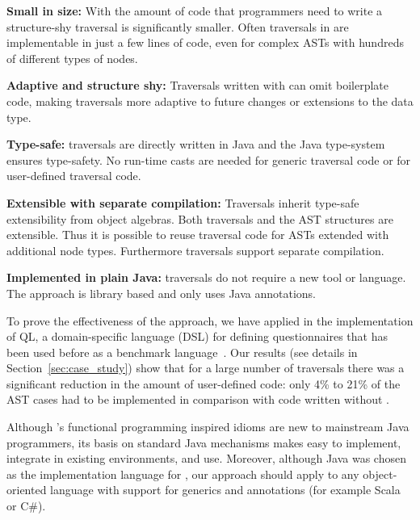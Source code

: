 \begin{itemize*}

\item {\bf Small in size:} With \name the amount of code that
  programmers need to write a structure-shy traversal is significantly smaller.
  Often traversals in \name are implementable in just a few lines
  of code, even for complex ASTs with hundreds of different types of
  nodes.

\item {\bf Adaptive and structure shy:}  Traversals written with \name can omit
  boilerplate code, making traversals more adaptive to
  future changes or extensions to the data type.

\item {\bf Type-safe:} \name traversals are directly written in Java
  and the Java type-system ensures type-safety. No run-time casts are
  needed for generic traversal code or for user-defined traversal
  code.

\item {\bf Extensible with separate compilation:} Traversals inherit type-safe
  extensibility from object algebras. Both traversals and the AST structures
  are extensible. Thus it is possible to
  reuse traversal code for ASTs extended with additional
  node types. Furthermore \name traversals support separate compilation.

\item {\bf Implemented in plain Java:} \name traversals do not require
  a new tool or language. The approach is library based and only uses
  Java annotations.


\end{itemize*}

To prove the effectiveness of the approach, we have applied \name in
the implementation of QL, a domain-specific language (DSL) for defining questionnaires that has been used before as a benchmark language~\cite{gouseti14extensible,erdweg2013state}.  Our results (see details in
Section~\ref{sec:case_study}) show that for a large number of traversals there was a
significant reduction in the amount of user-defined code: only 4\% to
21\% of the AST cases had to be implemented in comparison with code
written without \name.

Although \name's functional programming inspired idioms are new to
mainstream Java programmers, its basis on standard Java
mechanisms makes \name easy to implement, integrate in existing
environments, and use.  Moreover, although Java was chosen as the
implementation language for \Name, our approach should apply to any object-oriented
language with support for generics and annotations (for example Scala or C\#).

